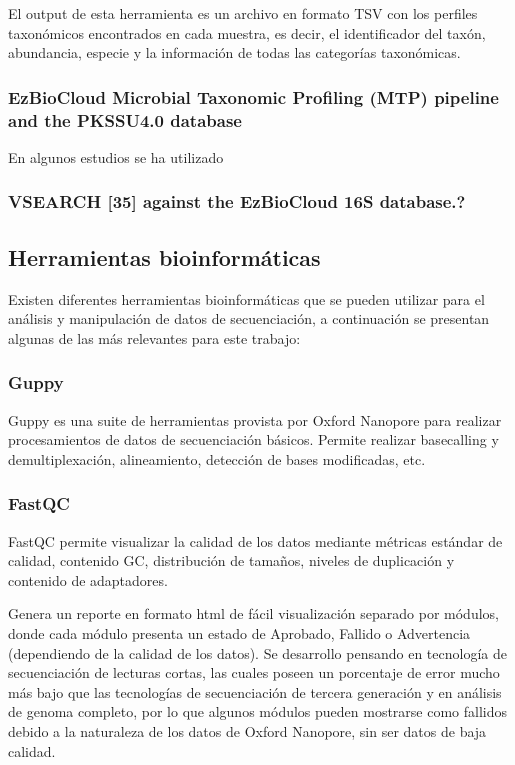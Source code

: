 El output de esta herramienta es un archivo en formato TSV con los perfiles taxonómicos encontrados en cada muestra, es decir, el identificador del taxón, abundancia, especie y la información de todas las categorías taxonómicas. 

\subsubsection{EzBioCloud Microbial Taxonomic Profiling (MTP) pipeline and the PKSSU4.0 database}
En algunos estudios se ha utilizado %
\subsubsection{VSEARCH [35] against the EzBioCloud 16S database.?}
\subsection{Herramientas bioinformáticas}
Existen diferentes herramientas bioinformáticas que se pueden utilizar para el análisis y manipulación de datos de secuenciación, a continuación se presentan algunas de las más relevantes para este trabajo:

\subsubsection{Guppy}
Guppy es una suite de herramientas provista por Oxford Nanopore para realizar procesamientos de datos de secuenciación básicos. Permite realizar basecalling y demultiplexación, alineamiento, detección de bases modificadas, etc.
\subsubsection{FastQC}
FastQC\cite{andrews2010fastqc} permite visualizar la calidad de los datos mediante métricas estándar de calidad, contenido GC, distribución de tamaños, niveles de duplicación  y contenido de adaptadores.


Genera un reporte en formato html de fácil visualización separado por módulos, donde cada módulo presenta un estado de Aprobado, Fallido o Advertencia (dependiendo de la calidad de los datos). Se desarrollo pensando en tecnología de secuenciación de lecturas cortas, las cuales poseen un porcentaje de error mucho más bajo que las tecnologías de secuenciación de tercera generación y en análisis de genoma completo, por lo que algunos módulos pueden mostrarse como fallidos debido a la naturaleza de los datos de Oxford Nanopore, sin ser datos de baja calidad.
